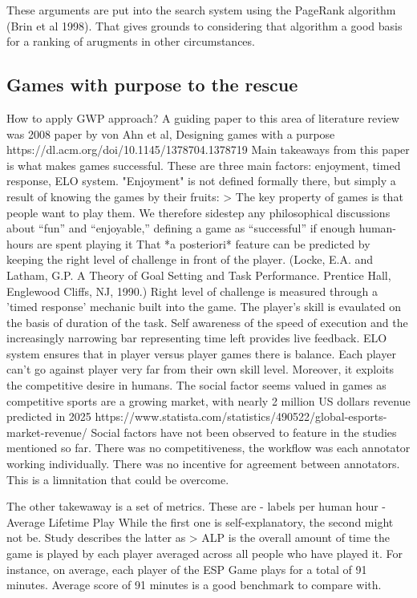 \documentclass{article}
\begin{document}
These arguments are put into the search system using the PageRank algorithm (Brin et al 1998). 
That gives grounds to considering that algorithm a good basis for a ranking of arugments in other circumstances.


\subsection{Games with purpose to the rescue}
How to apply GWP approach?
A guiding paper to this area of literature review was 2008 paper by von Ahn et al, Designing games with a purpose https://dl.acm.org/doi/10.1145/1378704.1378719
Main takeaways from this paper is what makes games successful.
These are three main factors: enjoyment, timed response, ELO system.
"Enjoyment" is not defined formally there, but simply a result of knowing the games by their fruits:
> The key property of games is that people want to play them. We therefore sidestep any philosophical discussions about “fun” and “enjoyable,” defining a game as “successful” if enough human-hours are spent playing it
That  *a posteriori* feature can be predicted by keeping the right level of challenge in front of the player. (Locke, E.A. and Latham, G.P. A Theory of Goal Setting and Task Performance. Prentice Hall, Englewood Cliffs, NJ, 1990.)
Right level of challenge is measured through a 'timed response' mechanic built into the game.
The player's skill is evaulated on the basis of duration of the task. 
Self awareness of the speed of execution and the increasingly narrowing bar representing time left provides live feedback.
ELO system ensures that in player versus player games there is balance. Each player can't go against player very far from their own skill level.
Moreover, it exploits the competitive desire in humans.
The social factor seems valued in games as competitive sports are a growing market, with nearly 2 million US dollars revenue predicted in 2025
https://www.statista.com/statistics/490522/global-esports-market-revenue/
Social factors have not been observed to feature in the studies mentioned so far.
There was no competitiveness, the workflow was each annotator working individually.
There was no incentive for agreement between annotators.
This is a limnitation that could be overcome.

The other takewaway is a set of metrics. These are
- labels per human hour
- Average Lifetime Play
While the first one is self-explanatory, the second might not be.
Study describes the latter as 
> ALP is the overall amount of time the game is played by each player averaged across all people who have played it. For instance, on average, each player of the ESP Game plays for a total of 91 minutes.
Average score of 91 minutes is a good benchmark to compare with.
\end{document}
